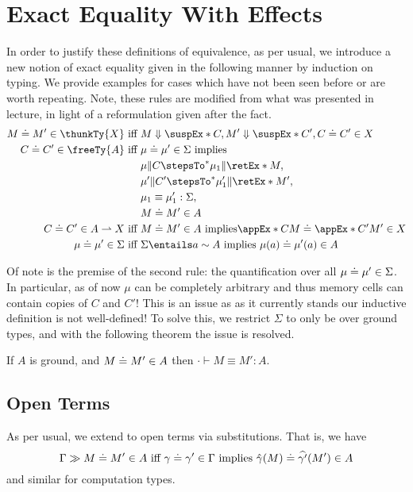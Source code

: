 \documentclass[letterpaper]{article}
\begin{document}
\section{Exact Equality With Effects}
In order to justify these definitions of equivalence, as per usual, we introduce a new notion of exact equality given in the following manner by induction on typing. We provide examples for cases which have not been seen before or are worth repeating. Note, these rules are modified from what was presented in lecture, in light of a reformulation given after the fact.
\begin{align*}
    \exEqOf{M}{M'}{\thunkTy{X}} \text{ iff }& M \Downarrow \suspEx*{C}, M' \Downarrow \suspEx*{C'}, \exEqOf{C}{C'}{X}\\
    \exEqOf{C}{C'}{\freeTy{A}} \text{ iff }& \exEqOf{\mu}{\mu'}{\Sigma} \text{ implies }\\
    &\mu \Vert C \stepsTo^* \mu_1 \Vert \retEx*{M},\\
    & \mu' \Vert C' \stepsTo^* \mu_1' \Vert \retEx*{M'},\\
    & \mu_1 \equiv \mu_1' : \Sigma,\\
    & \exEqOf{M}{M'}{A}\\
    \exEqOf{C}{C'}{A \rightharpoonup X} \text{ iff }& \exEqOf{M}{M'}{A} \text{ implies} \exEqOf{\appEx*{C}{M}}{\appEx*{C'}{M'}}{X}\\
    \exEqOf{\mu}{\mu'}{\Sigma} \text{ iff }& \Sigma \entails a \sim A \text{ implies } \exEqOf{\mu(a)}{\mu'(a)}{A}
\end{align*}

Of note is the premise of the second rule: the quantification over all $\mu\mathrel{\doteq}\mu' \in \Sigma$. In particular, as of now $\mu$ can be completely arbitrary and thus memory cells can contain copies of $C$ and $C'$! This is an issue as as it currently stands our inductive definition is not well-defined! To solve this, we restrict $\Sigma$ to only be over ground types, and with the following theorem the issue is resolved.
\begin{theorem}
    If $A$ is ground, and $M\mathrel{\doteq}M' \in A$ then $\cdot \vdash M \equiv M' : A$.
\end{theorem}
\subsection{Open Terms}
As per usual, we extend to open terms via substitutions. That is, we have
$$\Gamma \gg M\mathrel{\doteq}M' \in A \text{ iff } \gamma\mathrel{\doteq}\gamma' \in \Gamma \text{ implies } \hat{\gamma}(M)\mathrel{\doteq}\widehat{\gamma'}(M') \in A $$ 
and similar for computation types.
\end{document}
